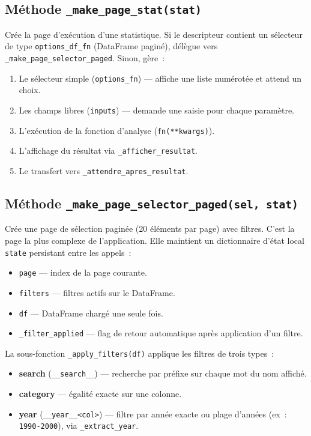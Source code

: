 \documentclass[12pt,a4paper]{article}
\begin{document}
\subsection{Méthode \texttt{\_make\_page\_stat(stat)}}
Crée la page d'exécution d'une statistique. Si le descripteur contient
un sélecteur de type \texttt{options\_df\_fn} (DataFrame paginé),
délègue vers \texttt{\_make\_page\_selector\_paged}. Sinon, gère~:
\begin{enumerate}
    \item Le sélecteur simple (\texttt{options\_fn}) — affiche une liste
    numérotée et attend un choix.
    \item Les champs libres (\texttt{inputs}) — demande une saisie
    pour chaque paramètre.
    \item L'exécution de la fonction d'analyse (\texttt{fn(**kwargs)}).
    \item L'affichage du résultat via \texttt{\_afficher\_resultat}.
    \item Le transfert vers \texttt{\_attendre\_apres\_resultat}.
\end{enumerate}

\subsection{Méthode \texttt{\_make\_page\_selector\_paged(sel, stat)}}
Crée une page de sélection paginée (20 éléments par page) avec filtres.
C'est la page la plus complexe de l'application. Elle maintient un
dictionnaire d'état local \texttt{state} persistant entre les appels~:
\begin{itemize}
    \item \texttt{page} — index de la page courante.
    \item \texttt{filters} — filtres actifs sur le DataFrame.
    \item \texttt{df} — DataFrame chargé une seule fois.
    \item \texttt{\_filter\_applied} — flag de retour automatique après
    application d'un filtre.
\end{itemize}

La sous-fonction \texttt{\_apply\_filters(df)} applique les filtres
de trois types~:
\begin{itemize}
    \item \textbf{search} (\texttt{\_\_search\_\_}) — recherche par
    préfixe sur chaque mot du nom affiché.
    \item \textbf{category} — égalité exacte sur une colonne.
    \item \textbf{year} (\texttt{\_\_year\_\_<col>}) — filtre par année
    exacte ou plage d'années (ex~: \texttt{1990-2000}), via
    \texttt{\_extract\_year}.
\end{itemize}
\end{document}
